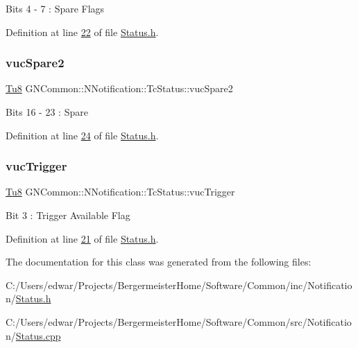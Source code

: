 Bits 4 -\/ 7 \+: Spare Flags 

Definition at line \mbox{\hyperlink{_status_8h_source_l00022}{22}} of file \mbox{\hyperlink{_status_8h_source}{Status.\+h}}.

\mbox{\label{class_g_n_common_1_1_n_notification_1_1_tc_status_aaee139b3984634b3cc3cc7e2b7175035}} 
\subsubsection{\texorpdfstring{vuc\+Spare2}{vucSpare2}}
{\footnotesize\ttfamily \mbox{\hyperlink{namespace_g_n_common_a7939e251ddbf5d3a31832dcfdc8bde39}{Tu8}} G\+N\+Common\+::\+N\+Notification\+::\+Tc\+Status\+::vuc\+Spare2}

Bits 16 -\/ 23 \+: Spare 

Definition at line \mbox{\hyperlink{_status_8h_source_l00024}{24}} of file \mbox{\hyperlink{_status_8h_source}{Status.\+h}}.

\mbox{\label{class_g_n_common_1_1_n_notification_1_1_tc_status_a4af337a51278a09d8500bab15d929af3}} 
\subsubsection{\texorpdfstring{vuc\+Trigger}{vucTrigger}}
{\footnotesize\ttfamily \mbox{\hyperlink{namespace_g_n_common_a7939e251ddbf5d3a31832dcfdc8bde39}{Tu8}} G\+N\+Common\+::\+N\+Notification\+::\+Tc\+Status\+::vuc\+Trigger}

Bit 3 \+: Trigger Available Flag 

Definition at line \mbox{\hyperlink{_status_8h_source_l00021}{21}} of file \mbox{\hyperlink{_status_8h_source}{Status.\+h}}.



The documentation for this class was generated from the following files\+:\begin{DoxyCompactItemize}
\item 
C\+:/\+Users/edwar/\+Projects/\+Bergermeister\+Home/\+Software/\+Common/inc/\+Notification/\mbox{\hyperlink{_status_8h}{Status.\+h}}\item 
C\+:/\+Users/edwar/\+Projects/\+Bergermeister\+Home/\+Software/\+Common/src/\+Notification/\mbox{\hyperlink{_status_8cpp}{Status.\+cpp}}\end{DoxyCompactItemize}
